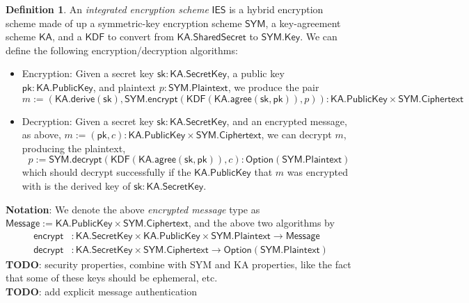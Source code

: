 \documentclass[a4paper]{article}
\newcommand{\TODO}[1]{{\color{red}\textbf{TODO}}: #1}
\theoremstyle{definition}
\newtheorem{definition}{Definition}[subsection]
\newcommand{\Ciphertext}{{\textsf{Ciphertext}}}
\newcommand{\IES}{{\textsf{IES}}}
\newcommand{\KA}{{\textsf{KA}}}
\newcommand{\KDF}{{\textsf{KDF}}}
\newcommand{\Key}{{\textsf{Key}}}
\newcommand{\Message}{{\textsf{Message}}}
\newcommand{\Option}{{\textsf{Option}}}
\newcommand{\Plaintext}{{\textsf{Plaintext}}}
\newcommand{\PublicKey}{{\textsf{PublicKey}}}
\newcommand{\SYM}{{\textsf{SYM}}}
\newcommand{\SecretKey}{{\textsf{SecretKey}}}
\newcommand{\SharedSecret}{{\textsf{SharedSecret}}}
\newcommand{\agree}{{\textsf{agree}}}
\newcommand{\decrypt}{{\textsf{decrypt}}}
\newcommand{\derive}{{\textsf{derive}}}
\newcommand{\encrypt}{{\textsf{encrypt}}}
\newcommand{\pk}{{\textsf{pk}}}
\newcommand{\sk}{{\textsf{sk}}}
\begin{document}
\begin{definition}
    An \emph{integrated encryption scheme} $\IES$ is a hybrid encryption scheme made of up a symmetric-key encryption scheme $\SYM$, a key-agreement scheme $\KA$, and a $\KDF$ to convert from $\KA.\SharedSecret$ to $\SYM.\Key$. We can define the following encryption/decryption algorithms:
    \begin{itemize}
        \item Encryption: Given a secret key $\sk: \KA.\SecretKey$, a public key $\pk: \KA.\PublicKey$, and plaintext $p : \SYM.\Plaintext$, we produce the pair
            \[m := (\KA.\derive(\sk), \SYM.\encrypt(\KDF(\KA.\agree(\sk, \pk)), p)) : \KA.\PublicKey \times \SYM.\Ciphertext\]
        \item Decryption: Given a secret key $\sk : \KA.\SecretKey$, and an encrypted message, as above, $m := (\pk, c) : \KA.\PublicKey \times \SYM.\Ciphertext$, we can decrypt $m$, producing the plaintext,
            \[p := \SYM.\decrypt(\KDF(\KA.\agree(\sk, \pk)), c) : \Option(\SYM.\Plaintext)\]
            which should decrypt successfully if the $\KA.\PublicKey$ that $m$ was encrypted with is the derived key of $\sk : \KA.\SecretKey$.
    \end{itemize}

    \textbf{Notation}: We denote the above \emph{encrypted message} type as $\Message := \KA.\PublicKey \times \SYM.\Ciphertext$, and the above two algorithms by
    \begin{align*}
        \encrypt &: \KA.\SecretKey \times \KA.\PublicKey \times \SYM.\Plaintext \to \Message \\
        \decrypt &: \KA.\SecretKey \times \SYM.\Ciphertext \to \Option(\SYM.\Plaintext)
    \end{align*}
    \TODO{security properties, combine with \SYM{} and \KA{} properties, like the fact that some of these keys should be ephemeral, etc.} \\
    \TODO{add explicit message authentication}
\end{definition}
\end{document}
